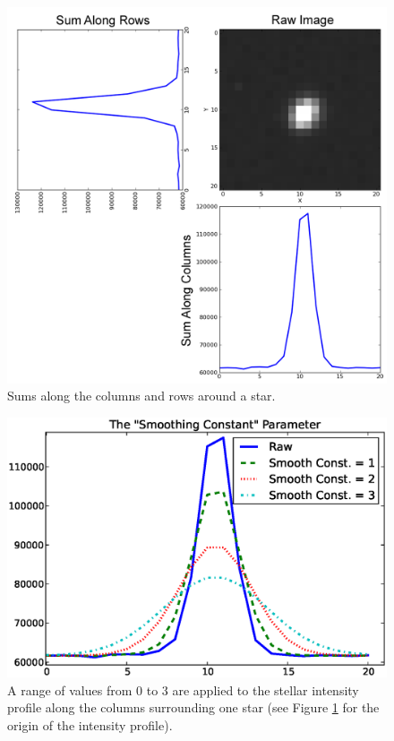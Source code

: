 \documentclass[a4paper]{article}
\begin{document}
\begin{figure}[h]
\begin{center}
\includegraphics[scale=0.20]{imgs/sums.png}
\caption{Sums along the columns and rows around a star.}
\label{fig:sumsExample}
\end{center}	
\end{figure}

\begin{figure}[h]
\begin{center}
\includegraphics[scale=0.45]{imgs/smooth.eps}
\caption{A range of  values from 0 to 3 are applied to the stellar intensity profile along the columns surrounding one star (see Figure \ref{fig:sumsExample} for the origin of the intensity profile).}
\label{fig:smoothExample}
\end{center}	
\end{figure}
\end{document}
